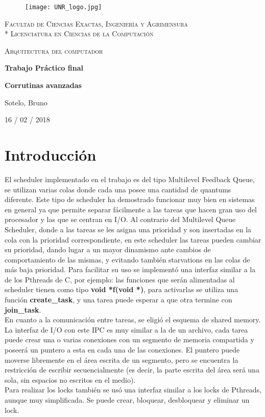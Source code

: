 \documentclass[a4paper]{article}
\begin{document}
\raggedright

\begin{titlepage}
\centering
\begin{figure}[H]
    \begin{center}
        \texttt{[image: UNR\_logo.jpg]}
    \end{center}
\end{figure}
{\scshape\large Facultad de Ciencias Exactas, Ingenier\'ia y Agrimensura\\*
                 Licenciatura en Ciencias de la Computaci\'on\par}
\vspace{5cm}
{\scshape\LARGE Arquitectura del computador \par}
{\huge\bfseries Trabajo Pr\'actico final \par}
{\huge\bfseries Corrutinas avanzadas \par}
\vspace{3cm}
{\Large Sotelo, Bruno\par}
\vfill
{\large 16  / 02 / 2018 \par}
\end{titlepage}



\section{Introducción}
El scheduler implementado en el trabajo es del tipo Multilevel Feedback 
Queue, se utilizan varias colas donde cada una posee una cantidad de
quantums diferente. Este tipo de scheduler ha demostrado funcionar muy
bien en sistemas en general ya que permite separar fácilmente a las
tareas que hacen gran uso del procesador y las que se centran en I/O. Al
contrario del Multilevel Queue Scheduler, donde a las tareas se les
asigna una prioridad y son insertadas en la cola con la prioridad 
correspondiente, en este scheduler las tareas pueden cambiar su prioridad,
dando lugar a un mayor dinamismo ante cambios de comportamiento de las
mismas, y evitando también starvations en las colas de más baja prioridad.
Para facilitar su uso se implementó una interfaz similar a la de los
Pthreads de C, por ejemplo: las funciones que serán alimentadas al scheduler
tienen como tipo \textbf{void *f(void *)}, para activarlas se utiliza una
función \textbf{create\_task}, y una tarea puede esperar a que otra termine
con \textbf{join\_task}. \\
En cuanto a la comunicación entre tareas, se eligió el esquema de shared
memory. La interfaz de I/O con este IPC es muy similar a la de un archivo,
cada tarea puede crear una o varias conexiones con un segmento de memoria
compartida y poseerá un puntero a esta en cada una de las conexiones. El
puntero puede moverse libremente en el área escrita de un segmento, pero
se encuentra la restricción de escribir secuencialmente (es decir, la 
parte escrita del área será una sola, sin espacios no escritos en el
medio). \\
Para realizar los locks también se usó una interfaz similar a los locks
de Pthreads, aunque muy simplificada. Se puede crear, bloquear, desbloquear
y eliminar un lock.
\end{document}
